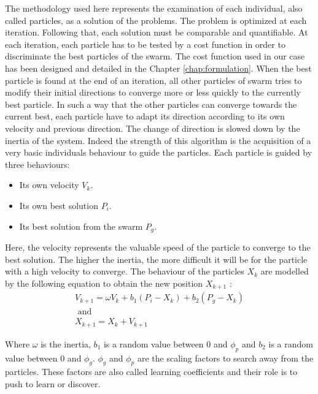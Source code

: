 The methodology used here represents the examination of each individual, also called particles, as a solution of the problems. The problem is optimized at each iteration. Following that, each solution must be comparable and quantifiable. At each iteration, each particle has to be tested by a cost function in order to discriminate the best particles of the swarm. The cost function used in our case has been designed and detailed in the Chapter \ref{chap:formulation}.
When the best particle is found at the end of an iteration, all other particles of swarm
 tries to modify their initial directions to converge more or less quickly to the currently best particle. 
In such a way that the other particles can converge towards the current best, each particle have to adapt its direction according to its own velocity and  previous direction. The change of direction is slowed down by the inertia of the system. 
Indeed the strength of this algorithm is the acquisition of a very basic individuals behaviour to guide the particles. 
Each particle is guided by three behaviours:
 \begin{itemize}
 \item  Its own velocity $V_k$. 
 \item  Its own best solution $P_i$.
 \item  Its best solution from the swarm $P_g$.
\end{itemize}  
Here, the velocity represents the valuable speed of the particle to converge to the best solution. 
The higher the inertia, the more difficult it will be for the particle with a high velocity to converge.
The behaviour of the particles $X_k$ are modelled by the following equation to obtain the new position $X_{k+1}$ :
\begin{equation} \label{eq:PSO}
\begin{split}
 V_{k+1}= \omega V_k +b_1(P_i -X_k)+b_2(P_g-X_k)
\\
\mbox{ and } \\ X_{k+1}=X_k+V_{k+1}
\end{split}
\end{equation}

Where $\omega$ is the inertia, $b_1$ is a random value between 0 and $\phi_p$ and $b_2$ is a random value between 0 and $\phi_g$. $\phi_g$ and $\phi_p$  are the scaling factors to search away from the particles. These factors are also called learning coefficients and their role is to push to learn or discover.%

